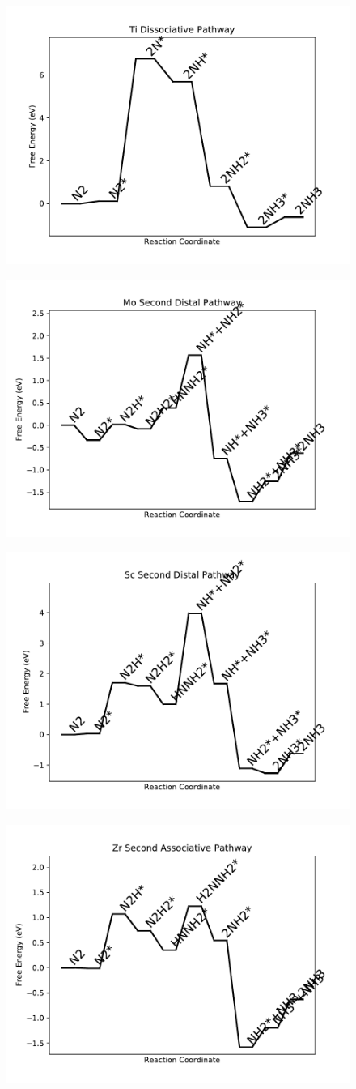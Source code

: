 \documentclass[journal=jacsat,manuscript=article]{achemso}
\begin{document}
\begin{figure}
\includegraphics[width=0.5\linewidth]{data/plots/Ti_dissociative.pdf}
\label{fig:Ti_dissociative}
\end{figure}

\newpage
\begin{figure}
\includegraphics[width=0.5\linewidth]{data/plots/Mo_distal_2.pdf}
\label{fig:Mo_distal_2}
\end{figure}

\begin{figure}
\includegraphics[width=0.5\linewidth]{data/plots/Sc_distal_2.pdf}
\label{fig:Sc_distal_2}
\end{figure}

\newpage
\begin{figure}
\includegraphics[width=0.5\linewidth]{data/plots/Zr_associative_2.pdf}
\label{fig:Zr_associative_2}
\end{figure}
\end{document}
